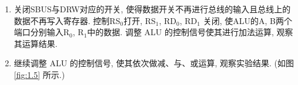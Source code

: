 \documentclass[../main.tex]{subfiles}
\begin{document}
\begin{enumerate}
    \item 关闭SBUS与DRW对应的开关, 使得数据开关不再进行总线的输入且总线上的数据不再写入寄存器.
          控制RS$_0$打开, RS$_1$, RD$_0$, RD$_1$ 关闭, 使ALU的A, B两个端口分别输入R$_0$, R$_1$中的数据.
          调整 ALU 的控制信号使其进行加法运算, 观察其运算结果.


    \item 继续调整 ALU 的控制信号, 使其依次做减、与、或运算, 观察实验结果. (如图 \ref{fig:1.5} 所示.)


\end{enumerate}
\end{document}
